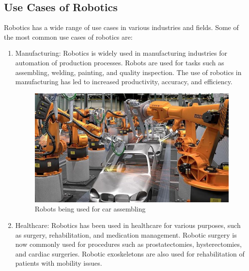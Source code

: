 \subsection{Use Cases of Robotics}
Robotics has a wide range of use cases in various industries and fields. Some of the most common use cases of robotics are:
\begin{enumerate}
    \item Manufacturing: Robotics is widely used in manufacturing industries for automation of production processes. Robots are used for tasks such as assembling, welding, painting, and quality inspection. The use of robotics in manufacturing has led to increased productivity, accuracy, and efficiency.
    
    \begin{figure}[H]
        \centering
        \includegraphics[scale=.225]{images/industral-robos.jpg}
        \caption[Car assembling robots]{Robots being used for car assembling} 
    \end{figure}

    \item Healthcare: Robotics has been used in healthcare for various purposes, such as surgery, rehabilitation, and medication management. Robotic surgery is now commonly used for procedures such as prostatectomies, hysterectomies, and cardiac surgeries. Robotic exoskeletons are also used for rehabilitation of patients with mobility issues.
    

\end{enumerate}
